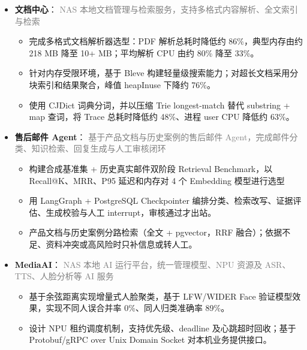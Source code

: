 \documentclass{resume}
\begin{document}
\begin{itemize}

    \item \textbf{文档中心}：
    {\small
    \noindent\textcolor{gray}{NAS 本地文档管理与检索服务，支持多格式内容解析、全文索引与检索}
    }
    \vspace{0.2ex}
    \begin{itemize}
        \item 完成多格式文档解析器选型：PDF 解析总耗时降低约 86\%，典型内存由约 218 MB 降至 10+ MB；平均解析 CPU 由约 80\% 降至 33\%。
        \item 针对内存受限环境，基于 Bleve 构建轻量级搜索能力；对超长文档采用分块索引和结果聚合，峰值 heapInuse 下降约 76\%。
        \item 使用 CJDict 词典分词，并以压缩 Trie longest-match 替代 substring + map 查词，将 Trace 总耗时降低约 48\%、进程 user CPU 降低约 63\%。
    \end{itemize}
    \vspace{1ex}

    \item \textbf{售后邮件 Agent}：
    {\small
    \noindent\textcolor{gray}{基于产品文档与历史案例的售后邮件 Agent，完成邮件分类、知识检索、回复生成与人工审核闭环}
    }
    \vspace{0.2ex}
    \begin{itemize}
        \item 构建合成基准集 + 历史真实邮件双阶段 Retrieval Benchmark，以 Recall@K、MRR、P95 延迟和内存对 4 个 Embedding 模型进行选型
        \item 用 LangGraph + PostgreSQL Checkpointer 编排分类、检索改写、证据评估、生成校验与人工 interrupt，审核通过才出站。
        \item 产品文档与历史案例分路检索（全文 + pgvector，RRF 融合）；依据不足、资料冲突或高风险时只补信息或转人工。
    \end{itemize}
    \vspace{1ex}

    \item \textbf{MediaAI}：
    {\small
    \noindent\textcolor{gray}{NAS 本地 AI 运行平台，统一管理模型、NPU 资源及 ASR、TTS、人脸分析等 AI 服务}
    }
    \vspace{0.2ex}
    \begin{itemize}
        \item 基于余弦距离实现增量式人脸聚类，基于 LFW/WIDER Face 验证模型效果，实现不同人误合并率 0\%、同人归类准确率 89\%。
        \item 设计 NPU 租约调度机制，支持优先级、deadline 及心跳超时回收；基于 Protobuf/gRPC over Unix Domain Socket 对本机业务提供接口。
    \end{itemize}
    \vspace{1ex}


\end{itemize}
\end{document}
